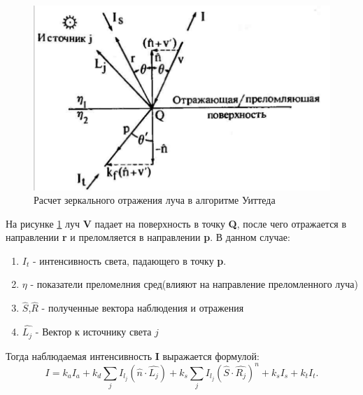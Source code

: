 \documentclass[a4paper,14pt, unknownkeysallowed]{extreport}
\begin{document}
\begin{figure}[h]
	\centering
	\includegraphics{global_reflections}
	\caption{Расчет зеркального отражения луча в алгоритме Уиттеда}
	\label{fig:global_reflections}
\end{figure} 

На рисунке  \ref{fig:global_reflections} луч \textbf{V} падает на поверхность в точку \textbf{Q}, после чего отражается в направлении \textbf{r} и преломляется
в направлении \textbf{p}.
В данном случае:
\begin{enumerate}
	\item $I_t$ - интенсивность света, падающего в точку \textbf{p}.
	\item $\eta$ - показатели преломелния сред(влияют на направление преломленного луча)
	\item $\hat{S}$,$\hat{R}$ - полученные вектора наблюдения и отражения
	\item $\hat{L_j}$ - Вектор к источнику света $j$

\end{enumerate}

Тогда наблюдаемая интенсивность \textbf{I} выражается формулой:
\begin{equation} 
	I = k_aI_a + k_d \sum_{j} I_{l_j}(\hat{n} \cdot \hat{L_j}) + k_s \sum_{j} I_{l_j}(\hat{S} \cdot \hat{R_j})^n + k_sI_s + k_tI_t.
	\label{eq:intensivity}
\end{equation}
\end{document}

